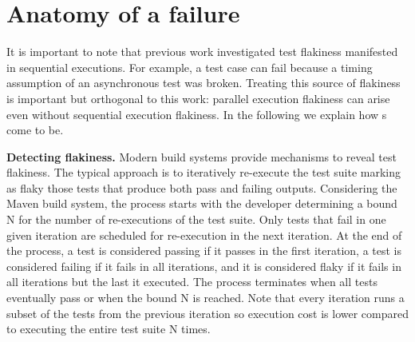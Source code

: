 \section{Anatomy of a \pef{} failure}

It is important to note that previous work investigated test flakiness
manifested in sequential executions.  For example, a
test case can fail because a timing assumption of an asynchronous test
was broken.  Treating this source of flakiness is important but
orthogonal to this work: parallel execution flakiness can arise even
without sequential execution flakiness.  In the following we explain
how \pef{}s come to be.


\noindent\textbf{Detecting flakiness.}  Modern build systems provide
mechanisms to reveal test flakiness. The typical approach is to
iteratively re-execute the test suite marking as flaky those tests
that produce both pass and failing outputs.  Considering the
Maven  build system, the process
starts with the developer determining a bound N for the number of
re-executions of the test suite.  Only tests that fail in one given
iteration are scheduled for re-execution in the next iteration.  At
the end of the process, a test is considered passing if it passes in
the first iteration, a test is considered failing if it fails in all
iterations, and it is considered flaky if it fails in all iterations
but the last it executed.  The process terminates when all tests
eventually pass or when the bound N is reached.  Note that every
iteration runs a subset of the tests from the previous iteration so
execution cost is lower compared to executing the entire test suite N
times.


